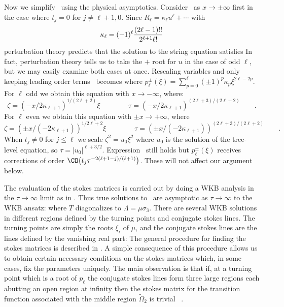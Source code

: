 Now we simplify \dforz\ using the physical asymptotics. 
Consider \dforz\ 
as $x\to \pm\infty$ first in the case where $t_j=0$ for 
$j\not= \ell+1,0$. 
Since $R_\ell=\kappa_\ell u^\ell +\cdots $ with 
$$\kappa_\ell=(-1)^\ell{(2\ell-1)!!\over 2^{\ell+1}\ell!}$$
perturbation theory predicts that the solution to
the string equation satisfies
\eqn{}
In fact, perturbation theory tells us to take the $+$ root for $u$ 
in the case of odd $\ell$, but we may easily examine both cases at once.
Rescaling variables and only keeping leading order terms 
\dforz\ becomes
\eqn{}
where
$p_\ell^\pm(\xi)=\sum_{p=0}^\ell (\pm 1)^p\kappa_p\xi^{2\ell-2p}$.
For $\ell$ odd we obtain this equation with $x\to -\infty$, 
where: 
$$\zeta=(-x/2\kappa_{\ell+1})^{1/(2\ell+2)}\xi \qquad\qquad 
\tau=(-x/2\kappa_{\ell+1})^{(2\ell+3)/(2\ell+2)}\qquad .$$ 
For $\ell$ even we obtain this equation with $\pm x\to +\infty$, where
$$\zeta=(\pm x/(-2\kappa_{\ell+1}))^{1/2\ell+2}\xi \qquad\qquad 
\tau=(\pm x/(-2\kappa_{\ell+1}))^{(2\ell+3)/(2\ell+2)}\qquad .$$
When $t_j\not=0$ for $j\leq \ell$ we scale $\zeta^2=u_0\xi^2$
where $u_0$ is the solution of the tree-level equation, so 
$\tau=|u_0|^{\ell+3/2}$. Expression \limeqt\ still holds but
$p^\pm_\ell(\xi)$ receives corrections of order $\CO\bigl(t_j
\tau^{-2(\ell+1-j)/(\ell+1)}\bigr)$. These will not affect 
our argument below. 

The evaluation of the stokes matrices is carried out by doing 
a WKB analysis in the $\tau\to\infty$ limit as in \Its . Thus 
true solutions to \limeqt\ are asymptotic as
$\tau\to\infty$ to the WKB ansatz:
\eqn{}
where $T$ diagonalizes \limeqt to $\Lambda=\mu\sigma_3$. 
There are several WKB solutions in different regions defined by 
the turning points and conjugate stokes lines. The turning 
points are simply the roots $\xi_i$ of $\mu$, and the  
conjugate stokes lines are the lines defined by the vanishing real 
part:
\eqn{}
The general procedure for finding the stokes matrices is described in 
\Its . A simple consequence of this procedure allows us to 
obtain certain necessary conditions on 
the stokes matrices which, in some cases, fix the parameters 
uniquely. The main observation is that
if, at a turning point 
which is a root of $p_\ell$ the conjugate stokes lines form three large 
regions each abutting an open region at infinity 
then the stokes matrix for the transition function associated with the middle 
region $\tilde \Omega_2$ is trivial \geom\ .

